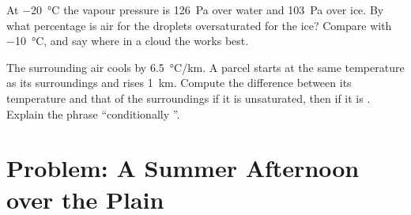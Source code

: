 \begin{exercise}[$\star\star\star$]\label{exo:g10:why-clouds-form:14}
At \qty{-20}{\degreeCelsius} the  vapour pressure is
\qty{126}{Pa} over water and \qty{103}{Pa} over ice. By what percentage is
air  for the droplets oversaturated for the ice? Compare with
\qty{-10}{\degreeCelsius}, and say where in a cloud the 
works best.
\end{exercise}

\begin{exercise}[$\star\star\star$]\label{exo:g10:why-clouds-form:15}
The surrounding air cools by \qty{6.5}{\degreeCelsius/km}. A parcel starts at
the same temperature as its surroundings and rises \qty{1}{km}. Compute the
difference between its temperature and that of the surroundings if it is
unsaturated, then if it is . Explain the phrase ``conditionally
''.
\end{exercise}

\section{Problem: A Summer Afternoon over the Plain}

